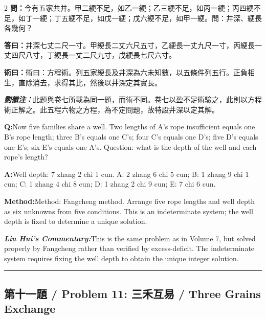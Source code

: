 \documentclass[11pt,a4paper]{article}
\newcommand{\cnwen}{\textcolor{cnlabelfg}{\textbf{問：}}}
\newcommand{\cnda}{\textbf{答曰：}}
\newcommand{\cnshu}{\textcolor{cnlabelfg}{\textbf{術曰：}}}
\newcommand{\cnzhu}{\textcolor{commentarycolor}{\textit{\textbf{劉徽注：}}}}
\newcommand{\enwen}{\textcolor{enlabelfg}{\textbf{Q:}}}
\newcommand{\enda}{\textcolor{enlabelfg}{\textbf{A:}}}
\newcommand{\enshu}{\textcolor{enlabelfg}{\textbf{Method:}}}
\newcommand{\enzhu}{\textcolor{enlabelfg}{\textit{\textbf{Liu Hui's Commentary:}}}}
\begin{document}
\begin{paracol}{2}
\switchcolumn[0]
\cnwen 今有五家共井。甲二綆不足，如乙一綆；乙三綆不足，如丙一綆；丙四綆不足，如丁一綆；丁五綆不足，如戊一綆；戊六綆不足，如甲一綆。問：井深、綆長各幾何？

\cnda 井深七丈二尺一寸。甲綆長二丈六尺五寸，乙綆長一丈九尺一寸，丙綆長一丈四尺八寸，丁綆長一丈二尺九寸，戊綆長七尺六寸。

\cnshu 術曰：方程術。列五家綆長及井深為六未知數，以五條件列五行。正負相生，直除消去，求得其比，然後以井深定其實長。

\cnzhu 此題與卷七所載為同一題，而術不同。卷七以盈不足術驗之，此則以方程術正解之。此五程六物之方程，為不定問題，故特設井深以定其解。

\switchcolumn[1]
\enwen Now five families share a well. Two lengths of A's rope insufficient equals one B's rope length; three B's equals one C's; four C's equals one D's; five D's equals one E's; six E's equals one A's. Question: what is the depth of the well and each rope's length?

\enda Well depth: 7 zhang 2 chi 1 cun. A: 2 zhang 6 chi 5 cun; B: 1 zhang 9 chi 1 cun; C: 1 zhang 4 chi 8 cun; D: 1 zhang 2 chi 9 cun; E: 7 chi 6 cun.

\enshu Method: Fangcheng method. Arrange five rope lengths and well depth as six unknowns from five conditions. This is an indeterminate system; the well depth is fixed to determine a unique solution.

\enzhu This is the same problem as in Volume 7, but solved properly by Fangcheng rather than verified by excess-deficit. The indeterminate system requires fixing the well depth to obtain the unique integer solution.
\end{paracol}

\bigskip\hrule\bigskip

\subsection{第十一題 / Problem 11: 三禾互易 / Three Grains Exchange}
\end{document}
